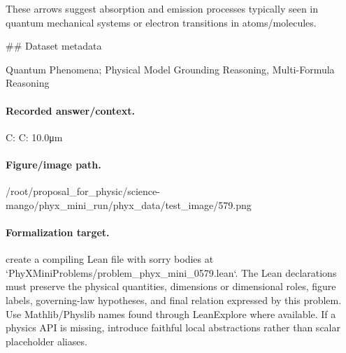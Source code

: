 These arrows suggest absorption and emission processes typically seen in quantum mechanical systems or electron transitions in atoms/molecules.

\#\# Dataset metadata

Quantum Phenomena; Physical Model Grounding Reasoning, Multi-Formula Reasoning

\paragraph{Recorded answer/context.}
C: C: 10.0μm

\paragraph{Figure/image path.}
/root/proposal\_for\_physic/science-mango/phyx\_mini\_run/phyx\_data/test\_image/579.png

\paragraph{Formalization target.}
create a compiling Lean file with sorry bodies at `PhyXMiniProblems/problem\_phyx\_mini\_0579.lean`. The Lean declarations must preserve the physical quantities, dimensions or dimensional roles, figure labels, governing-law hypotheses, and final relation expressed by this problem.
Use Mathlib/Physlib names found through LeanExplore where available. If a physics API is missing, introduce faithful local abstractions rather than scalar placeholder aliases.

